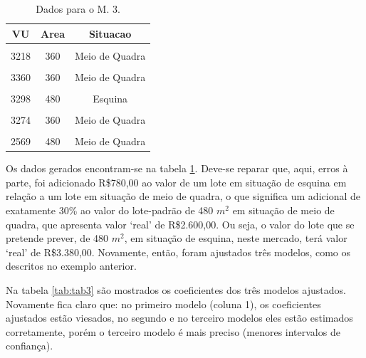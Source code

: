 \documentclass[
  a4paper, 11pt]{article}
\begin{document}
\begin{table}[ht]
\centering
\begin{tabular}{ccc}
  \hline
VU & Area & Situacao \\ 
  \hline
\cellcolor{gray!6}{3137} & \cellcolor{gray!6}{360} & \cellcolor{gray!6}{Meio de Quadra }\\ 
  3218 & 360 & Meio de Quadra \\ 
\cellcolor{gray!6}{  3116} & \cellcolor{gray!6}{360} & \cellcolor{gray!6}{Meio de Quadra }\\ 
  3360 & 360 & Meio de Quadra \\ 
\cellcolor{gray!6}{  3413} & \cellcolor{gray!6}{480} & \cellcolor{gray!6}{Esquina }\\ 
  3298 & 480 & Esquina \\ 
\cellcolor{gray!6}{  3249} & \cellcolor{gray!6}{360} & \cellcolor{gray!6}{Meio de Quadra }\\ 
  3274 & 360 & Meio de Quadra \\ 
\cellcolor{gray!6}{  2658} & \cellcolor{gray!6}{480} & \cellcolor{gray!6}{Meio de Quadra }\\ 
  2569 & 480 & Meio de Quadra \\ 
   \hline
\end{tabular}
\caption{Dados para o M. 3.} 
\label{tab:ex3}
\end{table}

Os dados gerados encontram-se na tabela \ref{tab:ex3}. Deve-se reparar
que, aqui, erros à parte, foi adicionado R\$780,00 ao valor de um lote
em situação de esquina em relação a um lote em situação de meio de
quadra, o que significa um adicional de exatamente 30\% ao valor do
lote-padrão de 480 \(m^2\) em situação de meio de quadra, que apresenta
valor `real' de R\$2.600,00. Ou seja, o valor do lote que se pretende
prever, de 480 \(m^2\), em situação de esquina, neste mercado, terá
valor `real' de R\$3.380,00. Novamente, então, foram ajustados três
modelos, como os descritos no exemplo anterior.

Na tabela \ref{tab:tab3} são mostrados os coeficientes dos três modelos
ajustados. Novamente fica claro que: no primeiro modelo (coluna 1), os
coeficientes ajustados estão viesados, no segundo e no terceiro modelos
eles estão estimados corretamente, porém o terceiro modelo é mais
preciso (menores intervalos de confiança).
\end{document}
